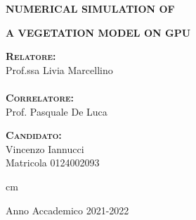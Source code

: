 \documentclass[12pt,italian,a4paper,oneside,openright]{book}
\begin{document}
{\vskip 1.1cm

\Large \centerline {\textsc{\textbf{NUMERICAL SIMULATION OF}}}
\Large \centerline {\textsc{\textbf{A VEGETATION MODEL ON GPU}}}

\vskip 1.1cm

\begin{minipage}[t]{7cm}
\normalsize \textsc{\textbf{Relatore:}}\\
Prof.ssa Livia Marcellino\\ \\
\normalsize \textsc{\textbf{Correlatore:}}\\
Prof. Pasquale De Luca
\end{minipage}
\hfill
\begin{minipage}[t]{5.5cm}
\normalsize \textsc{\textbf{Candidato:}}\\
Vincenzo Iannucci\\
Matricola 0124002093
\end{minipage}

 cm \Large \centerline {Anno Accademico 2021-2022}
\vfill \eject}


\newpage 

\ %

\newpage
\end{document}
